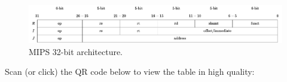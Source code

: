 \documentclass[a4paper]{article}
\begin{document}
    \begin{figure}[!htp]
        \centering
        \includegraphics[width=\textwidth]{img/mips-arch.pdf}
        \caption{MIPS 32-bit architecture.}
    \end{figure}
    
    \noindent
    Scan (or click) the QR code below to view the table in high quality:
    \begin{center}
    \end{center}

    \newpage
\end{document}
